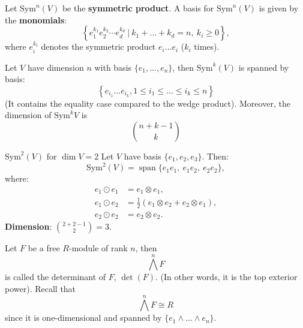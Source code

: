 \documentclass[openany]{book}
\newcommand{\Sym}{\text{Sym}} %
\newcommand{\tensor}{\otimes} %
\begin{document}
\begin{prop}
    Let $\text{Sym}^n(V)$ be the \textbf{symmetric product}. A basis for $\Sym^n(V)$ is given by the \textbf{monomials}:
\[
\left\{ e_1^{k_1} e_2^{k_2} \cdots e_d^{k_d} \ \Bigg| \ k_1+\dots+k_d = n, \ k_i \geq 0 \right\},
\]
where $e_i^{k_i}$ denotes the symmetric product $e_i\dots e_i$ ($k_i$ times). 

\end{prop}

\begin{prop}
    Let $V$ have dimension $n$ with basis $\{e_1,\dots, e_n\}$, then $\text{Sym}^k(V)$ is spanned by basis:
    \begin{equation*}
        \left\{ e_{i_1}\dots e_{i_k}, 1\leq i_1\leq\dots\leq i_{k}\leq n\right\}
    \end{equation*}
    (It contains the equality case compared to the wedge product). Moreover, the dimension of $\text{Sym}^kV$ is 
    \begin{equation*}
        \binom{n+k-1}{k}
    \end{equation*}
\end{prop}
\begin{example}
    $\Sym^2(V)$ for $\dim V = 2$
Let $V$ have basis $\{e_1, e_2, e_3\}$. Then:
\[
\Sym^2(V) = \operatorname{span}\{e_1e_1, \ e_1e_2, \ e_2e_2\},
\]
where:
\begin{align*}
    e_1 \odot e_1 &= e_1 \tensor e_1, \\
    e_1 \odot e_2 &= \frac{1}{2}(e_1 \tensor e_2 + e_2 \tensor e_1), \\
    e_2 \odot e_2 &= e_2 \tensor e_2.
\end{align*}
\textbf{Dimension}: $\binom{2 + 2 - 1}{2} = 3$.
\end{example}

\begin{defn}[determinant]
    Let $F$ be a free $R$-module of rank $n$, then 
    \begin{equation*}
        \bigwedge^nF
    \end{equation*}
    is called the determinant of $F$, $\det(F)$. (In other words, it is the top exterior power). Recall that 
    \begin{equation*}
        \bigwedge^nF\cong R
    \end{equation*}
    since it is one-dimensional and spanned by $\{e_1\wedge\dots\wedge e_n\}$.
\end{defn}
\end{document}
